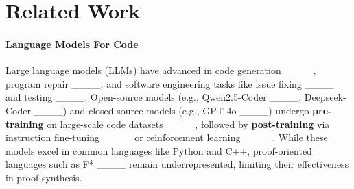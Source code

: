 \section{Related Work}


\paragraph{Language Models For Code}
Large language models (LLMs) have advanced in code generation ____, program repair ____, and software engineering tasks like issue fixing ____ and testing ____. Open-source models (e.g., Qwen2.5-Coder ____, Deepseek-Coder ____) and closed-source models (e.g., GPT-4o ____) undergo \textbf{pre-training} on large-scale code datasets ____, followed by \textbf{post-training} via instruction fine-tuning ____ or reinforcement learning ____. While these models excel in common languages like Python and C++, proof-oriented languages such as F* ____ remain underrepresented, limiting their effectiveness in proof synthesis.

